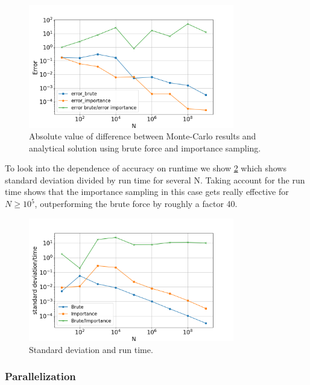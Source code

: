 \begin{figure}[H]
  \centering
  \includegraphics[width=0.8\textwidth]{../figures/mc_error.png}
  \caption{Absolute value of difference between Monte-Carlo results and analytical
  solution using brute force and importance sampling.}

  \label{fig:mc_error}
\end{figure}

To look into the dependence of accuracy on runtime we show \cref{fig:mc_std_time}
which shows standard deviation divided by run time for several N. Taking account
for the run time shows that the importance sampling in this case gets really
effective for $N \geq 10^5$, outperforming the brute force by roughly a factor
40.

\begin{figure}[H]
  \centering
  \includegraphics[width=0.8\textwidth]{../figures/mc_std_time.png}
  \caption{Standard deviation and run time.}

  \label{fig:mc_std_time}
\end{figure}

\subsubsection{Parallelization}

